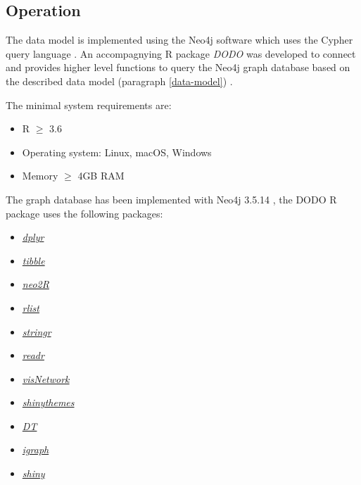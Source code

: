 \documentclass[9pt,a4paper,]{extarticle}
\begin{document}
\hypertarget{operation}{%
\subsection{Operation}\label{operation}}

The data model is implemented using the Neo4j software which uses the Cypher query language \citep{Neo4j2020}. An accompagnying R package \emph{DODO} was developed to connect and provides higher level functions to query the Neo4j graph database based on the described data model (paragraph \ref{data-model}) \citep{R2019}.

The minimal system requirements are:

\begin{itemize}
\item
  R \(\geq\) 3.6
\item
  Operating system: Linux, macOS, Windows
\item
  Memory \(\geq\) 4GB RAM
\end{itemize}

The graph database has been implemented with Neo4j 3.5.14 \citep{Neo4j2020}, the DODO R package uses the following packages:

\begin{itemize}
\item
  \emph{\href{https://CRAN.R-project.org/package=dplyr}{dplyr}} \citep{Wickham2019}
\item
  \emph{\href{https://CRAN.R-project.org/package=tibble}{tibble}} \citep{Muller2019}
\item
  \emph{\href{https://CRAN.R-project.org/package=neo2R}{neo2R}} \citep{Godard2018}
\item
  \emph{\href{https://CRAN.R-project.org/package=rlist}{rlist}} \citep{Ren2016}
\item
  \emph{\href{https://CRAN.R-project.org/package=stringr}{stringr}} \citep{Wickham2019b}
\item
  \emph{\href{https://CRAN.R-project.org/package=readr}{readr}} \citep{Wickham2018}
\item
  \emph{\href{https://CRAN.R-project.org/package=visNetwork}{visNetwork}} \citep{Almende2019}
\item
  \emph{\href{https://CRAN.R-project.org/package=shinythemes}{shinythemes}} \citep{Chang2018}
\item
  \emph{\href{https://CRAN.R-project.org/package=DT}{DT}} \citep{Xie2019}
\item
  \emph{\href{https://CRAN.R-project.org/package=igraph}{igraph}} \citep{Csardi2006}
\item
  \emph{\href{https://CRAN.R-project.org/package=shiny}{shiny}} \citep{Chang2019}
\end{itemize}
\end{document}
